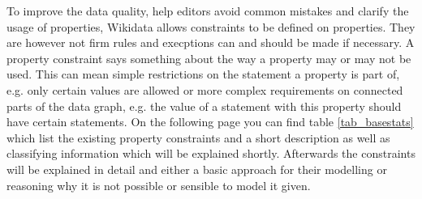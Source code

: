\documentclass[hyperref,bachelorofscience]{cgvpub}
\begin{document}
%
To improve the data quality, help editors avoid common mistakes and clarify the usage of properties, Wikidata allows constraints to be defined on properties. They are however not firm rules and execptions can and should be made if necessary. A property constraint says something about the way a property may or may not be used. This can mean simple restrictions on the statement a property is part of, e.g. only certain values are allowed or more complex requirements on connected parts of the data graph, e.g. the value of a statement with this property should have certain statements. On the following page you can find table \ref{tab_basestats} which list the existing property constraints and a short description as well as classifying information which will be explained shortly. Afterwards the constraints will be explained in detail and either a basic approach for their modelling or reasoning why it is not possible or sensible to model it given.\\
\end{document}
